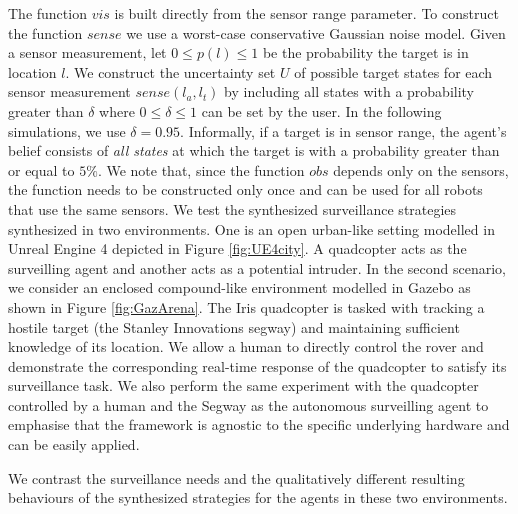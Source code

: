 The function $vis$ is built directly from the sensor range parameter. To construct the function $sense$ we use a worst-case conservative Gaussian noise model. Given a sensor measurement, let $0 \leq p(l) \leq 1$ be the probability the target is in location $l$. We construct the uncertainty set $U$ of possible target states for each sensor measurement $sense(l_a,l_t)$ by including all states with a probability greater than $\delta$ where $0\leq \delta \leq 1$ can be set by the user. In the following simulations, we use $\delta = 0.95$. Informally, if a target is in sensor range, the agent's belief consists of \emph{all states} at which the target is with a probability greater than or equal to $5\%$. We note that, since the function $obs$ depends only on the sensors, the function needs to be constructed only once and can be used for all robots that use the same sensors. 
We test the synthesized surveillance strategies synthesized in two environments. One is an open urban-like setting modelled in Unreal Engine 4 depicted in Figure \ref{fig:UE4city}. A quadcopter acts as the surveilling agent and another acts as a potential intruder. In the second scenario, we consider an enclosed compound-like environment modelled in Gazebo as shown in Figure \ref{fig:GazArena}. The Iris quadcopter is tasked with tracking a hostile target (the Stanley Innovations segway) and maintaining sufficient knowledge of its location. We allow a human to directly control the rover and demonstrate the corresponding real-time response of the quadcopter to satisfy its surveillance task. We also perform the same experiment with the quadcopter controlled by a human and the Segway as the autonomous surveilling agent to emphasise that the framework is agnostic to the specific underlying hardware and can be easily applied. 
  
We contrast the surveillance needs and the qualitatively different resulting behaviours of the synthesized strategies for the agents in these two environments.

